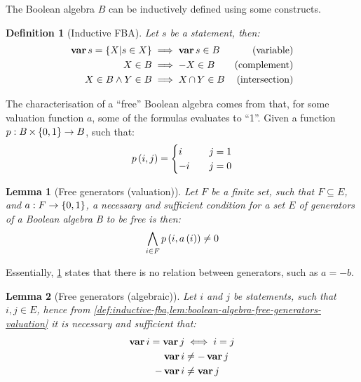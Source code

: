 \documentclass[12pt,openright,twoside,a4paper,oldfontcommands,english,brazil,final]{abntex2}
\newtheorem{definition}{Definition}[chapter]
\theoremstyle{theo}
\newtheorem{lemma}{Lemma}[chapter]
\def\varop{\ensuremath\operatorname{\mathbf{var}}}
\newcommand{\var}[1]{\ensuremath\varop #1}
\newcommand{\setsin}[1]{\ensuremath\left\{ #1 \right\}}
\newcommand{\parsin}[1]{\ensuremath\left( #1 \right)}
\def\inter{\ensuremath\operatorname{\cap}}
\def\cartesian{\ensuremath\operatorname{\times}}
\begin{document}
The Boolean algebra $B$ can be inductively defined using some constructs.
%
\begin{definition}[Inductive \acl*{FBA}]
\label{def:inductive-fba}
Let $s$ be a statement, then:
%
\begin{subequations}
\begin{align}
\var s = \setsin{X | s \in X} & \implies \var s \in B & \text{(variable)}\\
X \in B & \implies -X \in B                           & \text{(complement)}\\
X \in B \land Y \in B & \implies X \inter Y \in B     & \text{(intersection)}
\end{align}
\end{subequations}
%
\end{definition}

The characterisation of a ``free'' Boolean algebra comes from that, for some valuation function $a$, some of the formulas evaluates to ``1''.
Given a function $p:B \cartesian \setsin{0,1} \rightarrow B$, such that:
%
\begin{equation}
p\parsin{i,j} =
\begin{cases}
  i & \quad j = 1\\
  -i & \quad j = 0
\end{cases}
\end{equation}

\begin{lemma}[Free generators (valuation)]
\label{lem:boolean-algebra-free-generators-valuation}
Let $F$ be a finite set, such that $F \subseteq E$, and $a: F \rightarrow \setsin{0,1}$, a necessary and sufficient condition for a set $E$ of generators of a Boolean algebra B to be free is then:
%
\begin{equation}
\bigwedge_{i \in F} p\parsin{i, a \parsin{i}} \neq 0
\end{equation}
\end{lemma}


Essentially, \cref{lem:boolean-algebra-free-generators-valuation} states that there is no relation between generators, such as $a = -b$.

\begin{lemma}[Free generators (algebraic)]
Let $i$ and $j$ be statements, such that $i,j \in E$, hence from \cref{def:inductive-fba,lem:boolean-algebra-free-generators-valuation} it is necessary and sufficient that:
%
\begin{subequations}
\begin{align}
\var i = \var j & \iff i = j\\
\var i & \neq - \var j\\
-\var i & \neq \var j
\end{align}
\end{subequations}
%
\end{lemma}
%
\end{document}
